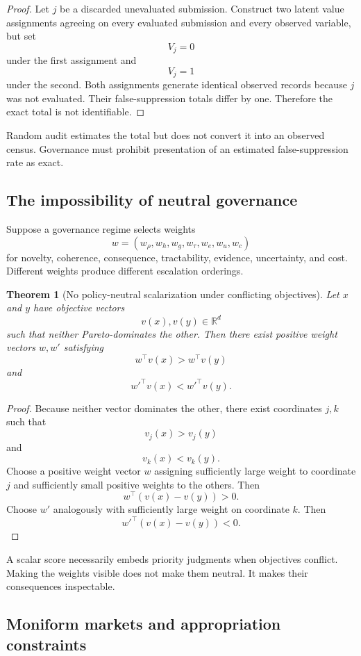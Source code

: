 \documentclass[11pt]{article}
\newtheorem{theorem}[definition]{Theorem}
\theoremstyle{definition}
\begin{document}
\begin{proof}
Let \(j\) be a discarded unevaluated submission. Construct two latent value assignments agreeing on every evaluated submission and every observed variable, but set
\[
V_j=0
\]
under the first assignment and
\[
V_j=1
\]
under the second. Both assignments generate identical observed records because \(j\) was not evaluated. Their false-suppression totals differ by one. Therefore the exact total is not identifiable.
\end{proof}

Random audit estimates the total but does not convert it into an observed census. Governance must prohibit presentation of an estimated false-suppression rate as exact.

\subsection{The impossibility of neutral governance}

Suppose a governance regime selects weights
\[
w
=
(w_\rho,w_h,w_g,w_\tau,w_e,w_u,w_c)
\]
for novelty, coherence, consequence, tractability, evidence, uncertainty, and cost. Different weights produce different escalation orderings.

\begin{theorem}[No policy-neutral scalarization under conflicting objectives]
Let \(x\) and \(y\) have objective vectors
\[
v(x),v(y)\in\mathbb{R}^{d}
\]
such that neither Pareto-dominates the other. Then there exist positive weight vectors \(w,w'\) satisfying
\[
w^{\top}v(x)>w^{\top}v(y)
\]
and
\[
w'^{\top}v(x)<w'^{\top}v(y).
\]
\end{theorem}

\begin{proof}
Because neither vector dominates the other, there exist coordinates \(j,k\) such that
\[
v_j(x)>v_j(y)
\]
and
\[
v_k(x)<v_k(y).
\]
Choose a positive weight vector \(w\) assigning sufficiently large weight to coordinate \(j\) and sufficiently small positive weights to the others. Then
\[
w^{\top}(v(x)-v(y))>0.
\]
Choose \(w'\) analogously with sufficiently large weight on coordinate \(k\). Then
\[
w'^{\top}(v(x)-v(y))<0.
\]
\end{proof}

A scalar score necessarily embeds priority judgments when objectives conflict. Making the weights visible does not make them neutral. It makes their consequences inspectable.

\subsection{Moniform markets and appropriation constraints}
\end{document}
